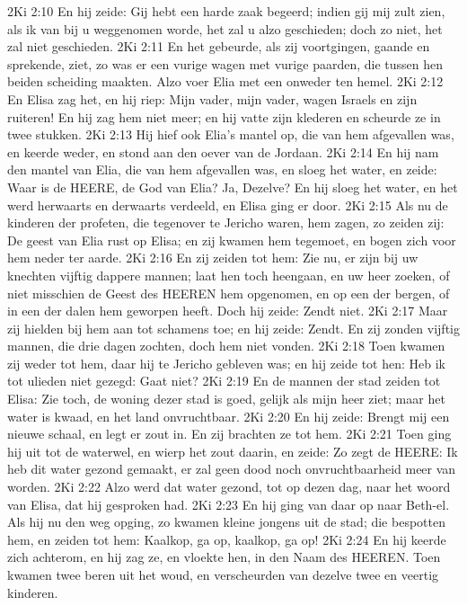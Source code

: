 2Ki 2:10  En hij zeide: Gij hebt een harde zaak begeerd; indien gij mij zult zien, als ik van bij u weggenomen worde, het zal u alzo geschieden; doch zo niet, het zal niet geschieden.
2Ki 2:11  En het gebeurde, als zij voortgingen, gaande en sprekende, ziet, zo was er een vurige wagen met vurige paarden, die tussen hen beiden scheiding maakten. Alzo voer Elia met een onweder ten hemel.
2Ki 2:12  En Elisa zag het, en hij riep: Mijn vader, mijn vader, wagen Israels en zijn ruiteren! En hij zag hem niet meer; en hij vatte zijn klederen en scheurde ze in twee stukken.
2Ki 2:13  Hij hief ook Elia's mantel op, die van hem afgevallen was, en keerde weder, en stond aan den oever van de Jordaan.
2Ki 2:14  En hij nam den mantel van Elia, die van hem afgevallen was, en sloeg het water, en zeide: Waar is de HEERE, de God van Elia? Ja, Dezelve? En hij sloeg het water, en het werd herwaarts en derwaarts verdeeld, en Elisa ging er door.
2Ki 2:15  Als nu de kinderen der profeten, die tegenover te Jericho waren, hem zagen, zo zeiden zij: De geest van Elia rust op Elisa; en zij kwamen hem tegemoet, en bogen zich voor hem neder ter aarde.
2Ki 2:16  En zij zeiden tot hem: Zie nu, er zijn bij uw knechten vijftig dappere mannen; laat hen toch heengaan, en uw heer zoeken, of niet misschien de Geest des HEEREN hem opgenomen, en op een der bergen, of in een der dalen hem geworpen heeft. Doch hij zeide: Zendt niet.
2Ki 2:17  Maar zij hielden bij hem aan tot schamens toe; en hij zeide: Zendt. En zij zonden vijftig mannen, die drie dagen zochten, doch hem niet vonden.
2Ki 2:18  Toen kwamen zij weder tot hem, daar hij te Jericho gebleven was; en hij zeide tot hen: Heb ik tot ulieden niet gezegd: Gaat niet?
2Ki 2:19  En de mannen der stad zeiden tot Elisa: Zie toch, de woning dezer stad is goed, gelijk als mijn heer ziet; maar het water is kwaad, en het land onvruchtbaar.
2Ki 2:20  En hij zeide: Brengt mij een nieuwe schaal, en legt er zout in. En zij brachten ze tot hem.
2Ki 2:21  Toen ging hij uit tot de waterwel, en wierp het zout daarin, en zeide: Zo zegt de HEERE: Ik heb dit water gezond gemaakt, er zal geen dood noch onvruchtbaarheid meer van worden.
2Ki 2:22  Alzo werd dat water gezond, tot op dezen dag, naar het woord van Elisa, dat hij gesproken had.
2Ki 2:23  En hij ging van daar op naar Beth-el. Als hij nu den weg opging, zo kwamen kleine jongens uit de stad; die bespotten hem, en zeiden tot hem: Kaalkop, ga op, kaalkop, ga op!
2Ki 2:24  En hij keerde zich achterom, en hij zag ze, en vloekte hen, in den Naam des HEEREN. Toen kwamen twee beren uit het woud, en verscheurden van dezelve twee en veertig kinderen.
